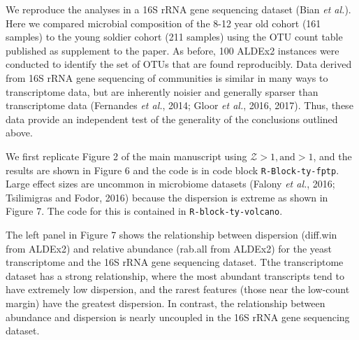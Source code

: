 \documentclass[onecolumn]{article}
\begin{document}
We reproduce the analyses in a 16S rRNA gene sequencing dataset (Bian
\emph{et al.}). Here we compared microbial composition of the 8-12 year
old cohort (161 samples) to the young soldier cohort (211 samples) using
the OTU count table published as supplement to the paper. As before, 100
ALDEx2 instances were conducted to identify the set of OTUs that are
found reproducibly. Data derived from 16S rRNA gene sequencing of
communities is similar in many ways to transcriptome data, but are
inherently noisier and generally sparser than transcriptome data
(Fernandes \emph{et al.}, 2014; Gloor \emph{et al.}, 2016, 2017). Thus,
these data provide an independent test of the generality of the
conclusions outlined above.

We first replicate Figure 2 of the main manuscript using
\(\mathcal{Z} > 1 \mathrm{, and} > 1\), and the results are shown in
Figure 6 and the code is in code block \texttt{R-Block-ty-fptp}. Large
effect sizes are uncommon in microbiome datasets (Falony \emph{et al.},
2016; Tsilimigras and Fodor, 2016) because the dispersion is extreme as
shown in Figure 7. The code for this is contained in
\texttt{R-block-ty-volcano}.

The left panel in Figure 7 shows the relationship between dispersion
(diff.win from ALDEx2) and relative abundance (rab.all from ALDEx2) for
the yeast transcriptome and the 16S rRNA gene sequencing dataset. Tthe
transcriptome dataset has a strong relationship, where the most abundant
transcripts tend to have extremely low dispersion, and the rarest
features (those near the low-count margin) have the greatest dispersion.
In contrast, the relationship between abundance and dispersion is nearly
uncoupled in the 16S rRNA gene sequencing dataset.
\end{document}
